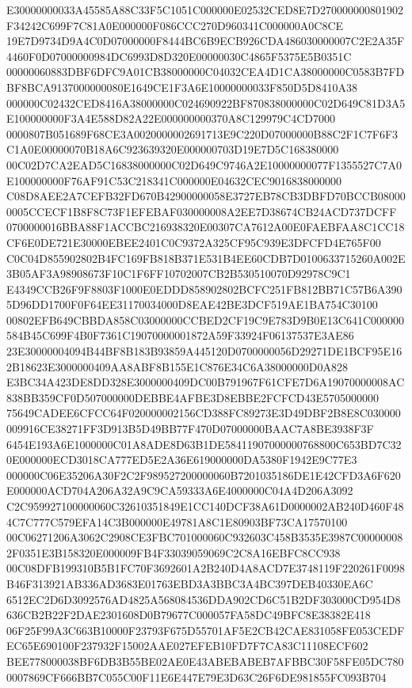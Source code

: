 \documentclass[UTF8,fontset=fandol,zihao=-4,a4paper]{ctexart}
\begin{document}
{{E30000000033A45585A88C33F5C1051C000000E02532CED8E7D270000000801902F34242C699F7C81A0E000000F086CCC270D960341C000000A0C8CE
19E7D9734D9A4C0D07000000F8444BC6B9ECB926CDA486030000007C2E2A35F4460F0D07000000984DC6993D8D320E00000030C4865F5375E5B0351C
00000060883DBF6DFC9A01CB38000000C04032CEA4D1CA38000000C0583B7FDBF8BCA9137000000080E1649CE1F3A6E10000000033F850D5D8410A38
000000C02432CED8416A38000000C024690922BF870838000000C02D649C81D3A5E100000000F3A4E588D82A22E000000000370A8C129979C4CD7000
0000807B051689F68CE3A0020000002691713E9C220D07000000B88C2F1C7F6F3C1A0E00000070B18A6C923639320E000000703D19E7D5C168380000
00C02D7CA2EAD5C16838000000C02D649C9746A2E10000000077F1355527C7A0E100000000F76AF91C53C218341C000000E04632CEC9016838000000
C08D8AEE2A7CEFB32FD670B42900000058E3727EB78CB3DBFD70BCCB080000005CCECF1B8F8C73F1EFEBAF030000008A2EE7D38674CB24ACD737DCFF
0700000016BBA88F1ACCBC216938320E00307CA7612A00E0FAEBFAA8C1CC18CF6E0DE721E30000EBEE2401C0C9372A325CF95C939E3DFCFD4E765F00
C0C04D855902802B4FC169FB818B371E531B4EE60CDB7D0100633715260A002E3B05AF3A98908673F10C1F6FF10702007CB2B530510070D92978C9C1
E4349CCB26F9F8803F1000E0EDDD858902802BCFC251FB812BB71C57B6A3905D96DD1700F0F64EE31170034000D8EAE42BE3DCF519AE1BA754C30100
00802EFB649CBBDA858C03000000CCBED2CF19C9E783D9B0E13C641C000000584B45C699F4B0F7361C19070000001872A59F33924F06137537E3AE86
23E30000004094B44BF8B183B93859A445120D0700000056D29271DE1BCF95E162B18623E3000000409AA8ABF8B155E1C876E34C6A38000000D0A828
E3BC34A423DE8DD328E3000000409DC00B791967F61CFE7D6A19070000008AC838BB359CF0D507000000DEBBE4AFBE3D8EBBE2FCFCD43E5705000000
75649CADEE6CFCC64F020000002156CD388FC89273E3D49DBF2B8E8C030000009916CE38271FF3D913B5D49BB77F470D07000000BAAC7A8BE3938F3F
6454E193A6E1000000C01A8ADE8D63B1DE58411907000000768800C653BD7C320E000000ECD3018CA777ED5E2A36E619000000DA5380F1942E9C77E3
000000C06E35206A30F2C2F989527200000060B7201035186DE1E42CFD3A6F620E000000ACD704A206A32A9C9CA59333A6E4000000C04A4D206A3092
C2C959927100000060C32610351849E1CC140DCF38A61D0000002AB240D460F484C7C777C579EFA14C3B000000E49781A8C1E80903BF73CA17570100
00C06271206A3062C2908CE3FBC701000060C932603C458B3535E3987C000000082F0351E3B158320E000009FB4F33039059069C2C8A16EBFC8CC938
00C08DFB199310B5B1FC70F3692601A2B240D4A8ACD7E3748119F220261F0098B46F313921AB336AD3683E01763EBD3A3BBC3A4BC397DEB40330EA6C
6512EC2D6D3092576AD4825A568084536DDA902CD6C51B2DF303000CD954D8636CB2B22F2DAE2301608D0B79677C000057FA58DC49BFC8E38382E418
06F25F99A3C663B10000F23793F675D55701AF5E2CB42CAE831058FE053CEDFEC65E690100F237932F15002AAE027EFEB10FD7F7CA83C11108ECF602
BEE778000038BF6DB3B55BE02AE0E43ABEBABEB7AFBBC30F58FE05DC7800007869CF666BB7C055C00F11E6E447E79E3D63C26F6DE981855FC093B704
}}
\end{document}
